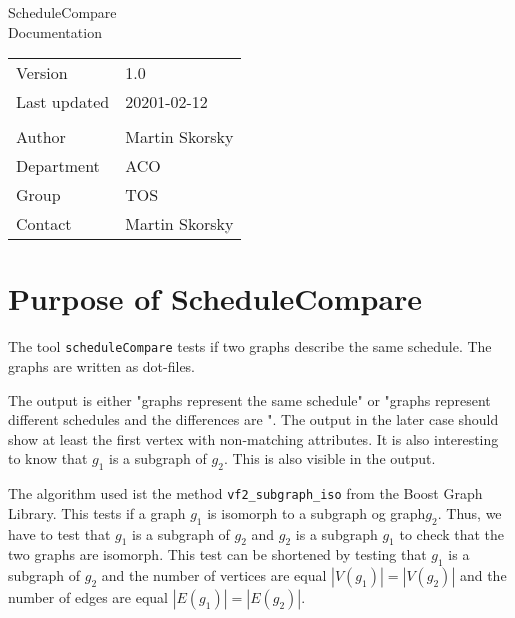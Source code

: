\documentclass[12pt,a4paper]{report}
\begin{document}
\begin{titlepage}
\begin{center}
\vspace{2em}
\Huge{ScheduleCompare}\\[2cm]
\Large{Documentation}\\[2cm]
\begin{large}
\begin{tabularx}{\textwidth}{Xl}
Version & 1.0\\
Last updated & 20201-02-12\\
\vspace{1.5cm}\\
Author & Martin Skorsky\\
Department & ACO \\
Group & TOS\\
Contact & Martin Skorsky
\end{tabularx}%
\end{large}

\vfill

\end{center}
\end{titlepage}
\tableofcontents
\chapter{Purpose of ScheduleCompare}
The tool \texttt{scheduleCompare} tests if two graphs describe the same schedule. The graphs are written as dot-files.

The output is either "graphs represent the same schedule" or "graphs represent different schedules and the differences are \textellipsis".
The output in the later case should show at least the first vertex with non-matching attributes.
It is also interesting to know that $g_1$ is a subgraph of $g_2$. This is also visible in the output.

The algorithm used ist the method \texttt{vf2\_subgraph\_iso} from the Boost Graph Library. This tests if a graph $g_1$ is isomorph 
to a subgraph og graph$g_2$. Thus, we have to test that $g_1$ is a subgraph of $g_2$ and $g_2$ is a subgraph $g_1$ to check 
that the two graphs are isomorph. This test can be shortened by testing that $g_1$ is a subgraph of $g_2$ and the number 
of vertices are equal $|V(g_1)| = |V(g_2)|$ and the number of edges are equal $|E(g_1)| = |E(g_2)|$.
\end{document}
